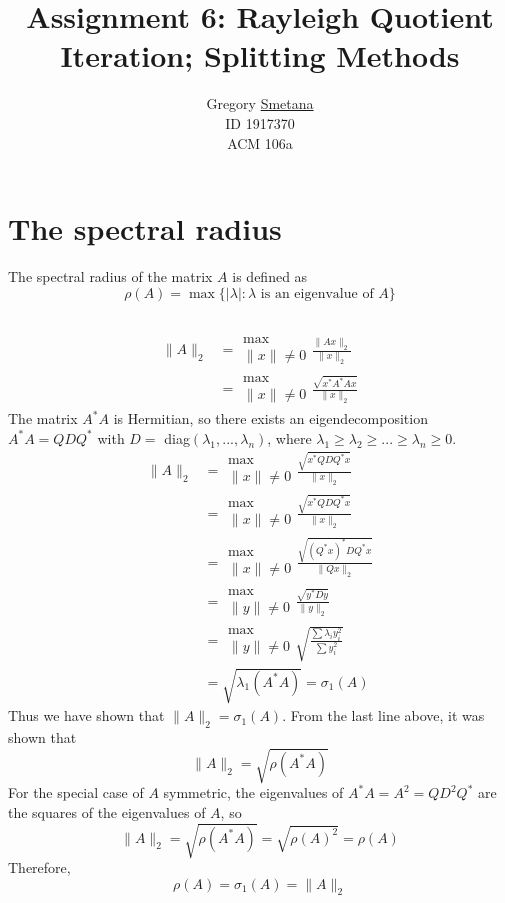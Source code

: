 \documentclass[11pt]{article} %
\title{Assignment 6: Rayleigh Quotient Iteration; Splitting Methods}
\author{ Gregory \uline{Smetana} \\ID 1917370 \\ ACM 106a }
\begin{document}
\maketitle


\section{The spectral radius}
The spectral radius of the matrix $A$ is defined as
\begin{equation}
\rho(A) = \max \{| \lambda | : \lambda \mbox{ is an eigenvalue of } A \}
\label{eq:spectral}
\end{equation}

\subsection{} %
\begin{equation}
\begin{split}
\| A \|_2 &= \substack{\max \\ \|x\|\ne 0} \frac{\|A x \|_2}{\|x\|_2}\\
&=  \substack{\max \\ \|x\|\ne 0} \frac{\sqrt{x^* A^* A x}}{\|x\|_2}
\end{split}
\end{equation}
The matrix $A^*A$ is Hermitian, so there exists an eigendecomposition $A^* A = Q D Q^*$ with $D = $ diag$(\lambda_1, ... , \lambda_n)$, where $\lambda_1 \ge \lambda_2 \ge ... \ge \lambda_n \ge 0$. 
\begin{equation}
\begin{split}
\| A \|_2 &=\substack{\max \\ \|x\|\ne 0} \frac{\sqrt{x^* Q D Q^* x}}{\|x\|_2}\\
&=\substack{\max \\ \|x\|\ne 0} \frac { \sqrt{x^* Q D Q^* x}}{\|x\|_2}\\
&=\substack{\max \\ \|x\|\ne 0} \frac { \sqrt{(Q^*x)^* D Q^* x}}{ \|Qx\|_2}\\
&=\substack{\max \\ \|y\|\ne 0} \frac { \sqrt{y^* D y}}{ \|y\|_2}\\
&=\substack{\max \\ \|y\|\ne 0} \sqrt{ \frac{\sum \lambda_i y_i^2}{\sum y_i^2}}\\
&= \sqrt{\lambda_1(A^*A)} = \sigma_1(A)
\end{split}
\end{equation}
Thus we have shown that $ \| A \|_2 = \sigma_1(A)$. From the last line above, it was shown that
\begin{equation}
\|A \|_2 = \sqrt{ \rho(A^* A)}
\end{equation}
For the special case of $A$ symmetric, the eigenvalues of $A^*A = A^2 =Q D^2 Q^*$ are the squares of the eigenvalues of $A$, so
\begin{equation}
\|A \|_2 = \sqrt{ \rho(A^* A)} = \sqrt{ \rho(A)^2} =\rho(A)
\end{equation}
Therefore,
\begin{equation}
\boxed{\rho(A)=\sigma_1(A) = \|A \|_2 }
\end{equation}
\end{document}
